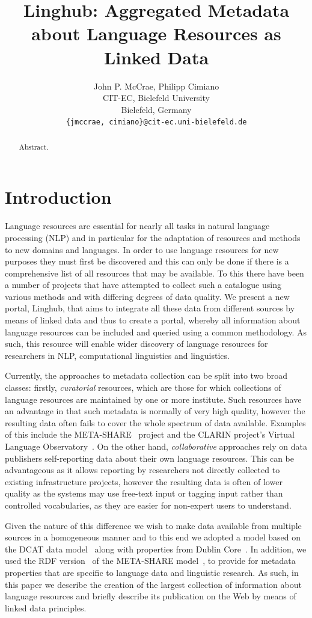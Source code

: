 \documentclass[11pt]{article}
\title{Linghub: Aggregated Metadata about Language Resources as Linked Data}
\author{John P. McCrae, Philipp Cimiano \\
  CIT-EC, Bielefeld University \\
  Bielefeld, Germany \\
  {\scriptsize\tt\{jmccrae, cimiano\}@cit-ec.uni-bielefeld.de}}
\date{}
\begin{document}
\maketitle
\begin{abstract}
    Abstract.
\end{abstract}

\section{Introduction}

Language resources are essential for nearly all tasks in natural language
processing (NLP) and in particular
for the adaptation of resources and methods to new domains and languages. In
order to use language resources for new purposes they must first be discovered
and this can only be done if there is a comprehensive list of all resources that
may be available. To this there have been a number of projects that have
attempted to collect such a catalogue using various methods and with differing
degrees of data quality. We present a new portal, Linghub, that aims to integrate all
these data from different sources by means of linked data and thus to create a
portal, whereby all information about language resources can be included and
queried using a common methodology. As such, this resource will enable wider
discovery of language resources for researchers in NLP, computational
linguistics and linguistics.

Currently, the approaches to metadata collection can be split into two broad
classes: firstly, \emph{curatorial} resources, which are those for which collections of
language resources are maintained by one or more institute. Such resources have
an advantage in that such metadata is normally of very high quality, however the
resulting data often fails to cover the whole spectrum of data available.
Examples of this include the META-SHARE~\cite{federmann2012meta} project and the
CLARIN project's Virtual Language Observatory~\cite[VLO]{van2012semantic}. On
the other hand, \emph{collaborative} approaches rely on data publishers
self-reporting data about their own language resources. This can be advantageous
as it allows reporting by researchers not directly collected to existing
infrastructure projects, however the resulting data is often of lower quality as
the systems may use free-text input or tagging input rather than controlled
vocabularies, as they are easier for non-expert users to understand.

Given the nature of this difference we wish to make data available from multiple
sources in a homogeneous manner and to this end we adopted a model based on the
DCAT data model~\cite{maali2014data} along with properties from Dublin
Core~\cite{weibel1998dublin}. In addition, we used the RDF
version~\cite{mccrae2015ontology} of the META-SHARE
model~\cite{gavrilidou2012meta}, to provide for metadata properties that are
specific to language data and linguistic research. As such, in this paper we
describe the creation of the largest collection of information about language
resources and briefly describe its publication on the Web by means of linked
data principles.
\end{document}

